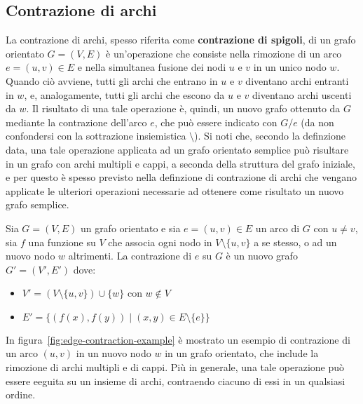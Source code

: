 \subsection{Contrazione di archi}\label{subsec:contrazione-di-archi}

La contrazione di archi, spesso riferita come \textbf{contrazione di spigoli}, di un grafo orientato $G = (V, E)$ \`e
un'operazione che consiste nella rimozione di un  arco $e = (u, v) \in E$ e nella simultanea fusione dei nodi $u$ e
$v$ in un unico nodo $w$.
Quando ci\`o avviene, tutti gli archi che entrano in $u$ e $v$ diventano archi entranti in $w$, e, analogamente,
tutti gli archi che escono da $u$ e $v$ diventano archi uscenti da $w$.
Il risultato di una tale operazione \`e, quindi, un nuovo grafo ottenuto da $G$ mediante la contrazione
dell'arco $e$, che pu\`o essere indicato con $G/e$ (da non confondersi con la sottrazione insiemistica $\setminus$).
Si noti che, secondo la definzione data, una tale operazione applicata ad un grafo orientato semplice pu\`o risultare
in un grafo con archi multipli e cappi, a seconda della struttura del grafo iniziale, e per questo \`e
spesso previsto nella definzione di contrazione di archi che vengano applicate le ulteriori operazioni necessarie ad
ottenere come risultato un nuovo grafo semplice. \newline

\begin{definition}
Sia $G = (V, E)$ un grafo orientato e sia $e = (u, v) \in E$ un arco di $G$ con $u \neq v$,
sia $f$ una funzione su $V$ che associa ogni nodo in $V \setminus \{u, v\}$ a se stesso, o ad un nuovo nodo $w$
altrimenti. \newline
La contrazione di $e$ su $G$ \`e un nuovo grafo $G' = (V', E')$ dove:
\begin{itemize}
    \item $V' = (V \setminus \{u, v\}) \cup \{w\}$ con $w \notin V$
    \item $E' = \{(f(x), f(y)) \mid (x, y) \in E \setminus \{e\}\}$
\end{itemize}
\end{definition}

In figura~\ref{fig:edge-contraction-example} \`e mostrato un esempio di contrazione di un arco $(u, v)$ in un nuovo
nodo $w$ in un grafo orientato, che include la rimozione di archi multipli e di cappi.
Pi\`u in generale, una tale operazione pu\`o essere eeguita su un insieme di archi, contraendo ciacuno di essi in
un qualsiasi ordine.


